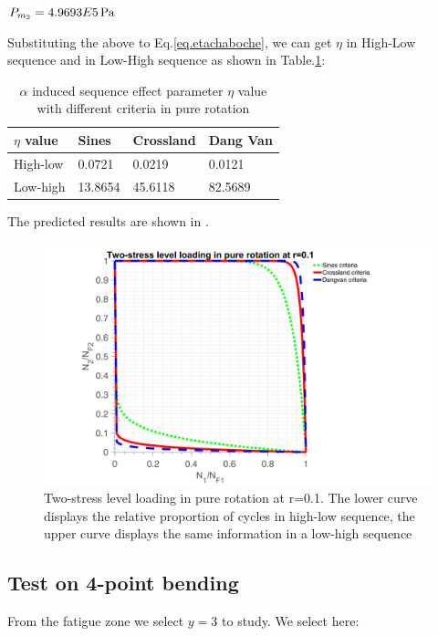 \vspace{6pt}
$P_{m_2}=4.9693E5  \, \textnormal{Pa}$

Substituting the above to Eq.\eqref{eq.etachaboche}, we can get $\eta$ in High-Low sequence and in Low-High sequence as shown in Table.\ref{tab.etarotation}:

\begin{table}[!h]
	\centering
	\begin{tabular}{llll}
		\hline
		$\eta$ value   & Sines  & Crossland & Dang Van \\ \hline
		High-low & 0.0721 & 0.0219    & 0.0121   \\
		Low-high & 13.8654 & 45.6118   & 82.5689  \\ \hline
	\end{tabular}
	\caption{$\alpha$ induced sequence effect parameter $\eta$ value with different criteria in pure rotation}
	\label{tab.etarotation}
\end{table}

The predicted results are shown in .

\begin{figure}[!h]
	\centering
	\includegraphics[width=\textwidth]{figures//2stressR.png} 
	\caption{Two-stress level loading in pure rotation at r=0.1. The lower curve displays the relative proportion of cycles in high-low sequence, the upper curve displays the same information in a low-high sequence}
	\label{2stressR}
\end{figure}

\newpage
\subsection{Test on 4-point bending}
From the fatigue zone we select $y=3$ to study. We select here:

